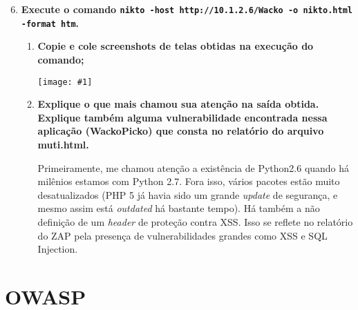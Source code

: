 \documentclass{article}
\newcommand{\code}[1]{\texttt{#1}}
\newcommand{\img}[1]{%
    \texttt{[image: \#1]}
}
\begin{document}
    \begin{enumerate}
        \setcounter{enumi}{5}
        \item \textbf{Execute o comando \code{nikto -host http://10.1.2.6/Wacko
            -o nikto.html -format htm}.}

            \begin{enumerate}
                \item \textbf{Copie e cole screenshots de telas obtidas na
                        execução do comando;}

                    \img{imgs/q1_5}

                \item \textbf{Explique o que mais chamou sua atenção na saída
                    obtida.  Explique também alguma vulnerabilidade encontrada
                    nessa aplicação (WackoPicko) que consta no relatório do
                    arquivo muti.html.}

                    Primeiramente, me chamou atenção a existência de Python2.6
                    quando há milênios estamos com Python 2.7. Fora isso,
                    vários pacotes estão muito desatualizados (PHP 5 já havia
                    sido um grande \textit{update} de segurança, e mesmo assim
                    está \textit{outdated} há bastante tempo). Há também a não
                    definição de um \textit{header} de proteção contra XSS\@.
                    Isso se reflete no relatório do ZAP pela presença de
                    vulnerabilidades grandes como XSS e SQL Injection.
            \end{enumerate}
    \end{enumerate}

    \section{OWASP}
\end{document}

